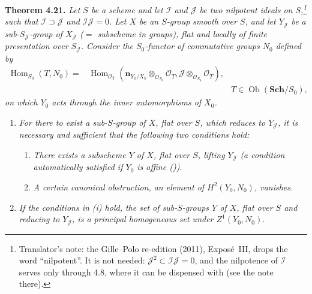 \medskip
\noindent{}\textbf{Theorem 4.21.}
\textit{Let \(S\) be a scheme and let \(\mathscr I\) and
\(\mathscr J\) be two nilpotent ideals on \(S\),\footnote{Translator's note: the Gille--Polo re-edition (2011), Exposé~III, drops the
word ``nilpotent''. It is not needed: \(\mathscr J^2\subset\mathscr I\mathscr J
=0\), and the nilpotence of \(\mathscr I\) serves only through 4.8, where it can
be dispensed with (see the note there).} such that \(\mathscr I\supset\mathscr J\) and
\(\mathscr I\mathscr J=0\). Let \(X\) be an \(S\)-group smooth over
\(S\), and let \(Y_{\mathscr J}\) be a sub-\(S_{\mathscr J}\)-group of
\(X_{\mathscr J}\) (\(=\) subscheme in groups), flat and locally of
finite presentation over \(S_{\mathscr J}\). Consider the \(S_0\)-functor of
commutative groups
\(N_0\) defined by}
\[
 \begin{aligned}
 \operatorname{Hom}_{S_0}(T,N_0)
 ={}&\operatorname{Hom}_{\mathscr O_T}
 \left(
  \mathbf n_{Y_0/X_0}\otimes_{\mathscr O_{S_0}}\mathscr O_T,
  \mathscr J\otimes_{\mathscr O_{S_0}}\mathscr O_T
 \right),\\[-0.2em]
 &\hspace{17em}T\in\operatorname{Ob}(\mathbf{Sch}/S_0),
 \end{aligned}
\]
\textit{on which \(Y_0\) acts through the inner automorphisms of
\(X_0\).}
\begin{enumerate}
\item[(i)] \textit{For there to exist a sub-\(S\)-group of \(X\), flat
  over \(S\), which reduces to \(Y_{\mathscr J}\), it is necessary and
  sufficient that the following two conditions hold:}
  \begin{enumerate}
  \item[\((i_1)\)] \textit{There exists a subscheme \(Y\) of \(X\),
    flat over \(S\), lifting \(Y_{\mathscr J}\) (a condition automatically
    satisfied if \(Y_0\) is affine \textup{()}).}
  \item[\((i_2)\)] \textit{A certain canonical obstruction, an element
    of \(H^2(Y_0,N_0)\), vanishes.}
  \end{enumerate}
\item[\SGAInlineRefTarget{sga3:iii:theorem:4-21:item:ii}(ii)] \textit{If the conditions in (i) hold, the set of
  sub-\(S\)-groups \(Y\) of \(X\), flat over \(S\) and reducing to
  \(Y_{\mathscr J}\), is a principal homogeneous set under
  \(Z^1(Y_0,N_0)\).}
\end{enumerate}

